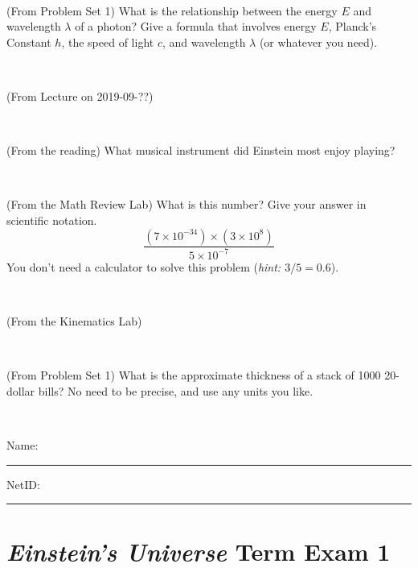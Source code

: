 \documentclass[12pt, letterpaper]{article}
\begin{document}
\vfill ~

\begin{problem} (From Problem Set 1)
What is the relationship between the energy $E$ and wavelength
$\lambda$ of a photon? Give a formula that involves energy $E$,
Planck's Constant $h$, the speed of light $c$, and wavelength
$\lambda$ (or whatever you need).
\end{problem}

\vfill ~

\begin{problem} (From Lecture on 2019-09-??)
\end{problem}


\vfill ~


\clearpage


\begin{problem} (From the reading)
What musical instrument did Einstein most enjoy playing?
\end{problem}


\vfill ~

\begin{problem} (From the Math Review Lab)
What is this number? Give your answer in scientific notation.
$$
\frac{(7\times10^{-34})\times(3\times10^8)}{5\times10^{-7}}
$$
You don't need a calculator to solve this problem (\textit{hint: $3/5=0.6$}).
\end{problem}


\vfill ~

\begin{problem} (From the Kinematics Lab)

\end{problem}


\vfill ~

\begin{problem} (From Problem Set 1)
What is the approximate thickness of a stack of 1000 20-dollar bills?
No need to be precise, and use any units you like.
\end{problem}


\vfill ~


\cleardoublepage



\noindent
Name: \rule[-1ex]{0.60\textwidth}{0.1pt}
NetID: \rule[-1ex]{0.20\textwidth}{0.1pt}

\section*{\textsl{Einstein's Universe} Term Exam 1}
\setcounter{problem}{1}
\end{document}
